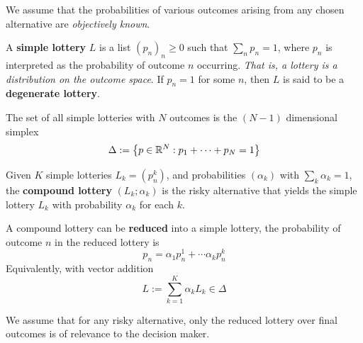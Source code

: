 \documentclass{article}
\begin{document}
	 		\begin{assumption}
	 			We assume that the probabilities of various outcomes arising from any chosen alternative are \emph{objectively known}.
	 		\end{assumption}
	 		
	 		\begin{definition}[6.B.1]
	 			A \textbf{simple lottery} $L$ is a list $(p_n)_n \geq 0$ such that $\sum_n p_n = 1$, where $p_n$ is interpreted as the probability of outcome $n$ occurring. \emph{That is, a lottery is a distribution on the outcome space}. If $p_n = 1$ for some $n$, then $L$ is said to be a \textbf{degenerate lottery}.
	 		\end{definition}
	 		
	 		\begin{remark}
	 			The set of all simple lotteries with $N$ outcomes is the $(N-1)$ dimensional simplex
	 			\begin{equation}
	 				\Delta := \left\{p \in \mathbb{R}^N: p_1 + \cdots + p_N = 1 \right\}
	 			\end{equation}
	 		\end{remark}
	 		
	 		\begin{definition}[6.B.2]
	 			Given $K$ simple lotteries $L_k = (p_n^k)$, and probabilities $(\alpha_k)$ with $\sum_k \alpha_k = 1$, the \textbf{compound lottery} $(L_k; \alpha_k)$ is the risky alternative that yields the simple lottery $L_k$ with probability $\alpha_k$ for each $k$.
	 		\end{definition}
	 		
	 		\begin{proposition}
	 			A compound lottery can be \textbf{reduced} into a simple lottery, the probability of outcome $n$ in the reduced lottery is
	 			\begin{equation}
	 				p_n = \alpha_1 p_n^1 + \cdots \alpha_k p_n^k
	 			\end{equation}
	 			Equivalently, with vector addition
	 			\begin{equation}
	 				L := \sum_{k=1}^K \alpha_k L_k \in \Delta
	 			\end{equation}
	 		\end{proposition}
	 		
	 		\begin{assumption}
	 			We assume that for any risky alternative, only the reduced lottery over final outcomes is of relevance to the decision maker.
	 		\end{assumption}
	 		
\end{document}
